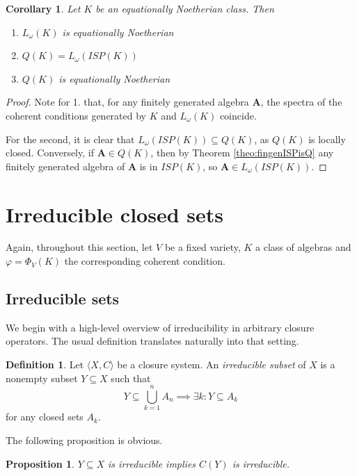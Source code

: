 \documentclass{article}
\theoremstyle{plain}
\newtheorem{corollary}[theorem]{Corollary}
\newtheorem{proposition}[theorem]{Proposition}
\theoremstyle{definition}
\newtheorem{definition}{Definition}[section]
\begin{document}
\begin{corollary}
    Let $K$ be an equationally Noetherian class.
    Then
    \begin{enumerate}
        \item $L_\omega(K)$ is equationally Noetherian
        \item $Q(K) = L_\omega(ISP(K))$
        \item $Q(K)$ is equationally Noetherian
    \end{enumerate}
\end{corollary}
\begin{proof}
    Note for 1. that, for any finitely generated algebra $\mathbf{A}$, the spectra of the coherent conditions generated by $K$ and $L_\omega(K)$ coincide.\par
    For the second, it is clear that $L_\omega(ISP(K)) \subseteq Q(K)$, as $Q(K)$ is locally closed.
    Conversely, if $\mathbf{A} \in Q(K)$, then by Theorem \ref{theo:fingenISPisQ} any finitely generated algebra of $\mathbf{A}$ is in $ISP(K)$, so $\mathbf{A} \in L_\omega(ISP(K))$.
\end{proof}




\section{Irreducible closed sets}

Again, throughout this section, let $V$ be a fixed variety, $K$ a class of algebras and $\varphi = \Phi_V(K)$ the corresponding coherent condition.


\subsection{Irreducible sets}


We begin with a high-level overview of irreducibility in arbitrary closure operators.
The usual definition translates naturally into that setting.

\begin{definition}
    Let $\langle X, C\rangle$ be a closure system.
    An \textit{irreducible subset} of $X$ is a nonempty subset $Y\subseteq X$ such that
    $$Y \subseteq \bigcup_{k=1}^n A_n \implies \exists k : Y\subseteq A_k$$
    for any closed sets $A_k$.
\end{definition}

The following proposition is obvious.

\begin{proposition}
    $Y\subseteq X$ is irreducible implies $C(Y)$ is irreducible.
\end{proposition}
\end{document}
